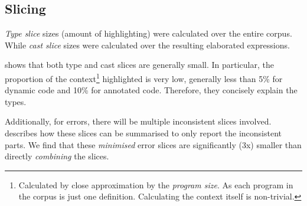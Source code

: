 \subsection{Slicing}
\textit{Type slice} sizes (amount of highlighting) were calculated over the entire corpus. While \textit{cast slice} sizes were calculated over the resulting elaborated expressions.

 shows that both type and cast slices are generally small. In particular, the proportion of the context\footnote{Calculated by close approximation by the \textit{program size}. As each program in the corpus is just one definition. Calculating the context itself is non-trivial.} highlighted is very low, generally less than 5\% for dynamic code and 10\% for annotated code. Therefore, they concisely explain the types.

Additionally, for errors, there will be multiple inconsistent slices involved.  describes how these slices can be summarised to only report the inconsistent parts. We find that these \textit{minimised} error slices are significantly (3x) smaller than directly \textit{combining} the slices.

